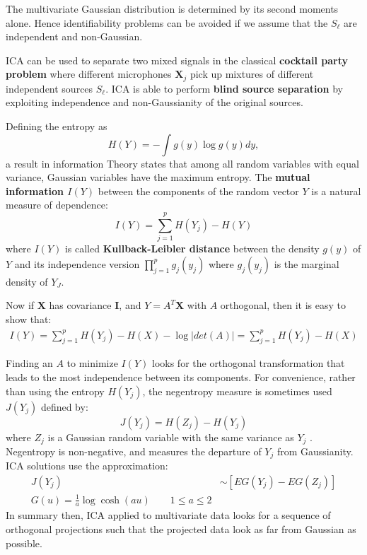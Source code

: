 \documentclass[12pt, letterpaper]{article}
\theoremstyle{definition}
\newcommand{\X}{\mathrm{\mathbf{X}}}
\newcommand{\I}{\mathrm{\mathbf{I}}}
\begin{document}
The multivariate Gaussian distribution is determined by its second moments alone. Hence identifiability problems can be avoided if we assume that the $S_\ell$ are independent and non-Gaussian.

ICA can be used to separate two mixed signals in the classical \textbf{cocktail party problem} where different microphones  $\X_j$ pick up mixtures of different independent sources $S_\ell$. ICA is able to perform \textbf{blind source separation} by exploiting independence and non-Gaussianity of the original sources.

Defining the entropy as 
\begin{equation}
H(Y) = -\int g(y) \log g(y) dy,
\end{equation}
a result in information Theory states that among all random variables with equal variance, Gaussian variables have the maximum entropy. The \textbf{mutual information $I(Y)$}  between the components of the random vector $Y$ is a natural measure of dependence:
\begin{equation}
I(Y) = \sum_{j=1}^pH(Y_j) - H(Y)
\end{equation}
where $I(Y)$ is called \textbf{Kullback-Leibler distance} between the density $g(y)$ of $Y$ and its independence version $\prod_{j=1}^p g_j(y_j)$ where $g_j(y_j)$ is the marginal density of $Y_J$.

Now if $\X$ has covariance $\I$, and $Y = A^T\X$ with $A$ orthogonal, then it is easy to show that:
\begin{equation}
\begin{aligned}
I(Y) = \sum_{j=1}^p H(Y_j)-H(X) - \log |det(A)| = \sum_{j=1}^p H(Y_j)-H(X)
\end{aligned}
\end{equation}

Finding an $A$ to minimize $I(Y)$ looks for the orthogonal transformation that leads to the most independence between its components. For convenience, rather than using the entropy $H(Y_j)$, the negentropy measure is sometimes used $J(Y_j)$ defined by:
\begin{equation}
J(Y_j) = H(Z_j) - H(Y_j)
\end{equation}
where $Z_j$ is a Gaussian random variable with the same variance as $Y_j$ . Negentropy is non-negative, and measures the departure of $Y_j$ from Gaussianity. ICA solutions use the approximation:
\begin{equation}
\begin{aligned}
J(Y_j) &\sim \left[EG(Y_j) - EG(Z_j)\right]\\
G(u) = \frac{1}{a}\log\cosh(au) \quad\quad 1\le a \le 2
\end{aligned}
\end{equation}
In summary then, ICA applied to multivariate data looks for a sequence of orthogonal projections such that the projected data look as far from Gaussian as possible.
\end{document}
